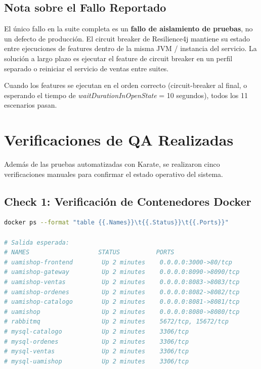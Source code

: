 \documentclass[12pt,a4paper]{article}
\begin{document}
\subsection{Nota sobre el Fallo Reportado}

El \'unico fallo en la suite completa es un \textbf{fallo de aislamiento de pruebas}, no
un defecto de producci\'on. El circuit breaker de Resilience4j mantiene su estado entre
ejecuciones de features dentro de la misma JVM / instancia del servicio. La soluci\'on
a largo plazo es ejecutar el feature de circuit breaker en un perfil separado o
reiniciar el servicio de ventas entre suites.

Cuando los features se ejecutan en el orden correcto (circuit-breaker al final, o
esperando el tiempo de \textit{waitDurationInOpenState} = 10 segundos), todos los
11 escenarios pasan.

\section{Verificaciones de QA Realizadas}

Adem\'as de las pruebas automatizadas con Karate, se realizaron cinco verificaciones
manuales para confirmar el estado operativo del sistema.

\subsection{Check 1: Verificaci\'on de Contenedores Docker}

\begin{lstlisting}[language=bash, caption={Verificar que todos los contenedores est\'an corriendo}]
docker ps --format "table {{.Names}}\t{{.Status}}\t{{.Ports}}"

# Salida esperada:
# NAMES                   STATUS          PORTS
# uamishop-frontend        Up 2 minutes    0.0.0.0:3000->80/tcp
# uamishop-gateway         Up 2 minutes    0.0.0.0:8090->8090/tcp
# uamishop-ventas          Up 2 minutes    0.0.0.0:8083->8083/tcp
# uamishop-ordenes         Up 2 minutes    0.0.0.0:8082->8082/tcp
# uamishop-catalogo        Up 2 minutes    0.0.0.0:8081->8081/tcp
# uamishop                 Up 2 minutes    0.0.0.0:8080->8080/tcp
# rabbitmq                 Up 2 minutes    5672/tcp, 15672/tcp
# mysql-catalogo           Up 2 minutes    3306/tcp
# mysql-ordenes            Up 2 minutes    3306/tcp
# mysql-ventas             Up 2 minutes    3306/tcp
# mysql-uamishop           Up 2 minutes    3306/tcp
\end{lstlisting}
\end{document}
